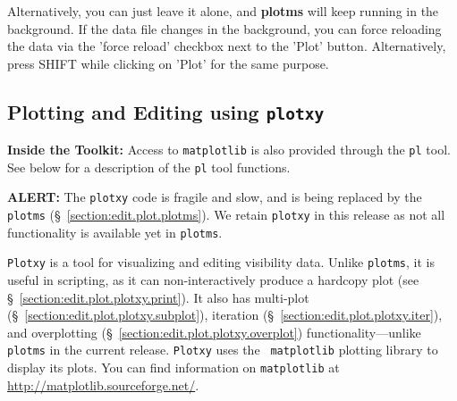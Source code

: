 Alternatively, you can just leave it alone, and {\bf plotms} will keep
running in the background. If the data file changes in the background,
you can force reloading the data via the 'force reload' checkbox
next to the 'Plot' button. Alternatively, press SHIFT while clicking
on 'Plot' for the same purpose.








\subsection{Plotting and Editing using {\tt plotxy}}
\label{section:edit.plot.plotxy}

{\bf Inside the Toolkit:}
     Access to {\tt matplotlib} is also provided through 
     the {\tt pl} tool. 
     See below for a description of the {\tt pl} tool functions. 


{\bf ALERT:} The {\tt plotxy} code is fragile and slow, and is being replaced by the {\tt plotms} (\S~\ref{section:edit.plot.plotms}). We retain {\tt plotxy} in this release as not all functionality is available yet in {\tt plotms}.


{\tt Plotxy} is a tool for visualizing and editing visibility
data. Unlike {\tt plotms}, it is useful in scripting, as it can
non-interactively produce a hardcopy plot (see
\S~\ref{section:edit.plot.plotxy.print}). It also has multi-plot
(\S~\ref{section:edit.plot.plotxy.subplot}), iteration
(\S~\ref{section:edit.plot.plotxy.iter}), and overplotting
(\S~\ref{section:edit.plot.plotxy.overplot}) functionality---unlike
{\tt plotms} in the current release. {\tt Plotxy} uses the {\tt
  matplotlib} plotting library to display its plots. You can find
information on {\tt matplotlib} at
\url{http://matplotlib.sourceforge.net/}.







